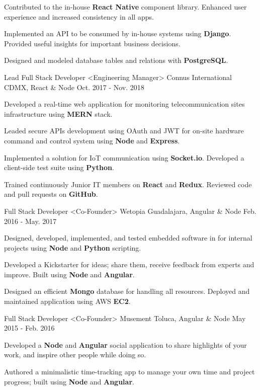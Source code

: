 \begin{cventries}
{\begin{cvitems}
        \item {Contributed to the in-house \textbf{React Native} component library. Enhanced user experience and increased consistency in all apps.}
        \item {Implemented an API to be consumed by  in-house systems using \textbf{Django}. Provided useful insights for important business decisions.}
        \item {Designed and modeled database tables and relations with \textbf{PostgreSQL}.}
      \end{cvitems}
    }
  \cventry
    {Lead Full Stack Developer <Engineering Manager>}
    {Connus International}
    {CDMX, React \& Node}
    {Oct. 2017 - Nov. 2018}
    {
      \begin{cvitems}
        \item {Developed a real-time web application for monitoring telecommunication sites infrastructure using \textbf{MERN} stack.}
        \item {Leaded secure APIs development using OAuth and JWT for on-site hardware command and control system using \textbf{Node} and \textbf{Express}.}
        \item {Implemented a solution for IoT communication using \textbf{Socket.io}. Developed a client-side test suite using \textbf{Python}.}
        \item {Trained continuously Junior IT members on \textbf{React} and \textbf{Redux}. Reviewed code and pull requests on \textbf{GitHub}.}
      \end{cvitems}
    }
    \cventry
      {Full Stack Developer <Co-Founder>}
      {Wetopia}
      {Guadalajara, Angular \& Node}
      {Feb. 2016 - May. 2017}
      {
        \begin{cvitems}
          \item{Designed, developed, implemented, and tested embedded software in for internal projects using \textbf{Node} and \textbf{Python} scripting.}
          \item {Developed a Kickstarter for ideas; share them, receive feedback from experts and improve. Built using \textbf{Node} and \textbf{Angular}.}
          \item {Designed an efficient \textbf{Mongo} database for handling all resources. Deployed and maintained application using AWS \textbf{EC2}.}
        \end{cvitems}
      }
      \cventry
        {Full Stack Developer <Co-Founder>}
        {Musement}
        {Toluca, Angular \& Node}
        {May 2015 - Feb. 2016}
        {
          \begin{cvitems}
            \item {Developed a \textbf{Node} and \textbf{Angular} social application to share highlights of your work, and inspire other people while doing so.}
            \item {Authored a minimalistic time-tracking app to manage your own time and project progress; built using \textbf{Node} and \textbf{Angular}.}
          \end{cvitems}
        }
  \end{cventries}
